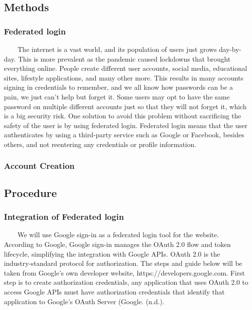 \subsection{Methods}
\subsubsection{Federated login}
~~~~The internet is a vast world, and its population of users just grows day-by-day. This is more prevalent as the pandemic caused lockdowns that brought everything online. People create different user accounts, social media, educational sites, lifestyle applications, and many other more. This results in many accounts signing in credentials to remember, and we all know how passwords can be a pain, we just can't help but forget it. Some users may opt to have the same password on multiple different accounts just so that they will not forget it, which is a big security risk. One solution to avoid this problem without sacrificing the safety of the user is by using federated login. Federated login means that the user authenticates by using a third-party service such as Google or Facebook, besides others, and not reentering any credentials or profile information.

\subsubsection{Account Creation}

\subsection{Procedure}
\subsubsection{Integration of Federated login}
~~~~We will use Google sign-in as a federated login tool for the website. According to Google, Google sign-in manages the OAuth 2.0 flow and token lifecycle, simplifying the integration with Google APIs. OAuth 2.0 is the industry-standard protocol for authorization. The steps and guide below will be taken from Google’s own developer website, https://developers.google.com.
First step is to create authorization credentials, any application that uses OAuth 2.0 to access Google APIs must have authorization credentials that identify that application to Google’s OAuth Server (Google. (n.d.).

